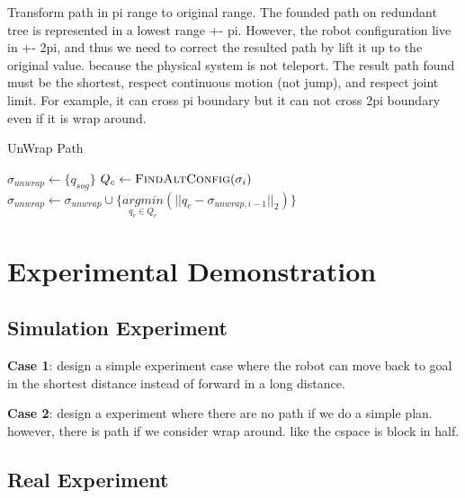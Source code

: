 Transform path in pi range to original range. The founded path on redundant tree is represented in a lowest range +- pi. However, the robot configuration live in +- 2pi, and thus we need to correct the resulted path by lift it up to the original value. because the physical system is not teleport. The result path found must be the shortest, respect continuous motion (not jump), and respect joint limit. For example, it can cross pi boundary but it can not cross 2pi boundary even if it is wrap around.

\begin{algorithm}[!h]
    \small
    \caption{UnWrap Path}

    \begin{algorithmic}
        \State $\sigma_{unwrap} \gets \{q_{sog}\}$
        \State $Q_c \gets \textsc{FindAltConfig}(\sigma_i)$
        \State $\sigma_{unwrap} \gets \sigma_{unwrap} \cup  \{\underset{q_c \in Q_c}{argmin}(|| q_c - \sigma_{unwrap,i-1} ||_2)\}$
        \EndFor
        \EndFunction
    \end{algorithmic}
\end{algorithm}











\section{Experimental Demonstration}

\subsection{Simulation Experiment}

\textbf{Case 1}: design a simple experiment case where the robot can move back to goal in the shortest distance instead of forward in a long distance.

\textbf{Case 2}: design a experiment where there are no path if we do a simple plan. however, there is path if we consider wrap around. like the cspace is block in half.



\subsection{Real Experiment}


